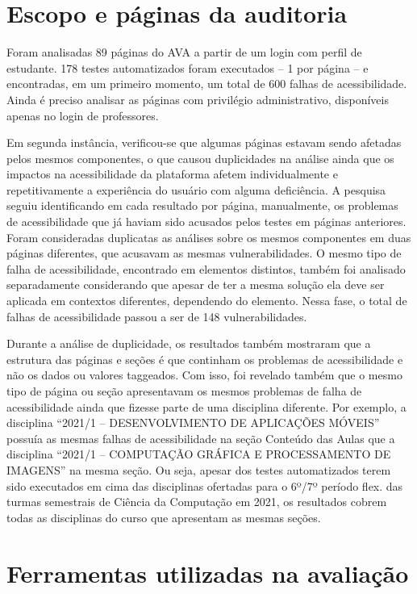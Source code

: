 \documentclass[
	12pt,				%
	openright,			%
	oneside,			%
	a4paper,			%
	chapter=TITLE,		%
	section=TITLE,		%
	subsection=TITLE,	%
	subsubsection=TITLE,%
	english,			%
	brazil				%
	]{abntex2}
\theoremstyle{definition}
\begin{document}
\section{Escopo e páginas da auditoria}

Foram analisadas 89 páginas do AVA a partir de um login com perfil de estudante. 178 testes automatizados foram executados – 1 por página – e encontradas, em um primeiro momento, um total de 600 falhas de acessibilidade. Ainda é preciso analisar as páginas com privilégio administrativo, disponíveis apenas no login de professores.

Em segunda instância, verificou-se que algumas páginas estavam sendo afetadas pelos mesmos componentes, o que causou duplicidades na análise ainda que os impactos na acessibilidade da plataforma afetem individualmente e repetitivamente a experiência do usuário com alguma deficiência. A pesquisa seguiu identificando em cada resultado por página, manualmente, os problemas de acessibilidade que já haviam sido acusados pelos testes em páginas anteriores. Foram consideradas duplicatas as análises sobre os mesmos componentes em duas páginas diferentes, que acusavam as mesmas vulnerabilidades. O mesmo tipo de falha de acessibilidade, encontrado em elementos distintos, também foi analisado separadamente considerando que apesar de ter a mesma solução ela deve ser aplicada em contextos diferentes, dependendo do elemento. Nessa fase, o total de falhas de acessibilidade passou a ser de 148 vulnerabilidades.

Durante a análise de duplicidade, os resultados também mostraram que a estrutura das páginas e seções é que continham os problemas de acessibilidade e não os dados ou valores taggeados. Com isso, foi revelado também que o mesmo tipo de página ou seção apresentavam os mesmos problemas de falha de acessibilidade ainda que fizesse parte de uma disciplina diferente. Por exemplo, a disciplina “2021/1 – DESENVOLVIMENTO DE APLICAÇÕES MÓVEIS” possuía as mesmas falhas de acessibilidade na seção Conteúdo das Aulas que a disciplina “2021/1 – COMPUTAÇÃO GRÁFICA E PROCESSAMENTO DE IMAGENS” na mesma seção. Ou seja, apesar dos testes automatizados terem sido executados em cima das disciplinas ofertadas para o 6º/7º período flex. das turmas semestrais de Ciência da Computação em 2021, os resultados cobrem todas as disciplinas do curso que apresentam as mesmas seções.


\section{Ferramentas utilizadas na avaliação}
\end{document}
